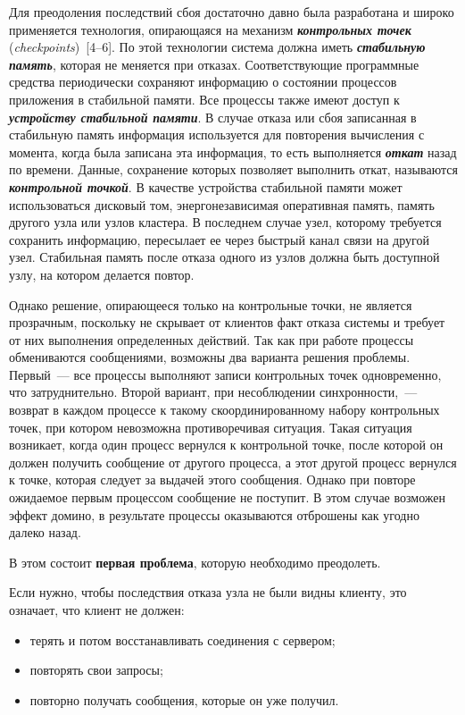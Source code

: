 \begin{multicols}{2}
{Для преодоления последствий сбоя до\-ста\-точно давно была разработана и широко 
при\-ме\-ня\-ется технология, опирающаяся на механизм 
{\bfseries\textit{контрольных точек}} (\textit{checkpoints})~[4--6]. По этой 
техно\-ло\-гии система должна иметь {\bfseries\textit{стабильную память}}, 
которая не меняется при отказах. Со\-от\-вет\-ст\-ву\-ющие программные средства 
периодически сохраняют информацию о состоянии процессов приложения в стабильной 
памяти. Все про\-цессы также имеют доступ к {\bfseries\textit{устройству 
стабильной памяти}}.  В случае отказа или сбоя записанная в стабильную память 
информация используется для повторения вы\-чис\-ле\-ния с момента,\linebreak 
когда была записана эта информация, то есть выполняется 
{\bfseries\textit{откат}} назад по времени. Данные, сохранение которых 
позволяет выполнить откат, называются {\bfseries\textit{контрольной точкой}}. В 
качестве устройства стабильной памяти может использоваться дисковый том, 
энергонезависимая оперативная память, память другого узла или узлов 
клас\-те\-ра. В последнем случае узел, которому требуется сохранить информацию, 
пересылает ее
 через быстрый канал связи на другой
узел. Стабильная память после отказа одного из узлов должна быть доступной
узлу, на котором делается повтор.

Однако решение, опирающееся только на контрольные точки, не является
прозрачным, поскольку не скрывает от клиентов факт отказа сис\-те\-мы и требует
от них выполнения определенных действий. Так как при работе процессы
обмениваются сообщениями, возможны два варианта решения проблемы.
Первый~--- все процессы выполняют записи контрольных точек одновременно,
что затруднительно. Второй вариант, при несоблюдении синхронности,~---
возврат в каждом процессе к такому скоординированному набору контрольных
точек, при котором невозможна противоречивая ситуация. Такая ситуация
возникает, когда один процесс вернулся к контрольной точке, после которой он
должен получить сообщение от другого процесса, а этот другой процесс
вернулся к точке, которая следует за выдачей этого сообщения. Однако при
повторе ожидаемое первым процессом сообщение не поступит. В этом случае
возможен эффект домино, в результате процессы оказываются отброшены как
угодно далеко назад.
{ %

}

В этом состоит \textbf{первая проблема}, которую необходимо преодолеть.

Если нужно, чтобы последствия отказа узла не были видны клиенту,  это
означает, что клиент не должен:
\begin{itemize}
\item
терять и потом восстанавливать соединения с сервером;
\item  повторять свои запросы;
\item  повторно получать сообщения, которые он уже получил.
\end{itemize}

}
\end{multicols}
